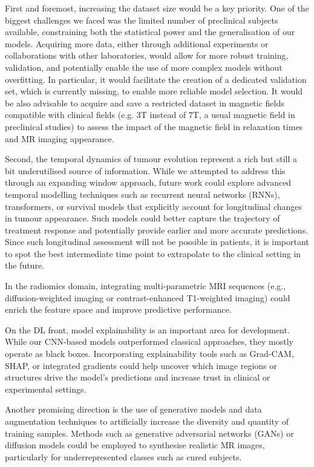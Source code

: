 \documentclass[12pt, a4paper]{report}
\begin{document}
First and foremost, increasing the dataset size would be a key priority. One of the biggest challenges we faced was the limited number of preclinical subjects available, constraining both the statistical power and the generalisation of our models. Acquiring more data, either through additional experiments or collaborations with other laboratories, would allow for more robust training, validation, and potentially enable the use of more complex models without overfitting. In particular, it would facilitate the creation of a dedicated validation set, which is currently missing, to enable more reliable model selection. It would be also advisable to acquire and save a restricted dataset in magnetic fields compatible with clinical fields (e.g. 3T instead of 7T, a usual magnetic field in preclinical studies) to assess the impact of the magnetic field in relaxation times and MR imaging appearance. 

Second, the temporal dynamics of tumour evolution represent a rich but still a bit underutilised source of information. While we attempted to address this through an expanding window approach, future work could explore advanced temporal modelling techniques such as recurrent neural networks (RNNs), transformers, or survival models that explicitly account for longitudinal changes in tumour appearance. Such models could better capture the trajectory of treatment response and potentially provide earlier and more accurate predictions. Since such longitudinal assessment will not be possible in patients, it is important to spot the best intermediate time point to extrapolate to the clinical setting in the future. 

In the radiomics domain, integrating multi-parametric MRI sequences (e.g., diffusion-weighted imaging or contrast-enhanced T1-weighted imaging) could enrich the feature space and improve predictive performance.

On the DL front, model explainability is an important area for development. While our CNN-based models outperformed classical approaches, they mostly operate as black boxes. Incorporating explainability tools such as Grad-CAM, SHAP, or integrated gradients could help uncover which image regions or structures drive the model's predictions and increase trust in clinical or experimental settings.

Another promising direction is the use of generative models and data augmentation techniques to artificially increase the diversity and quantity of training samples. Methods such as generative adversarial networks (GANs) or diffusion models could be employed to synthesise realistic MR images, particularly for underrepresented classes such as cured subjects.
\end{document}
